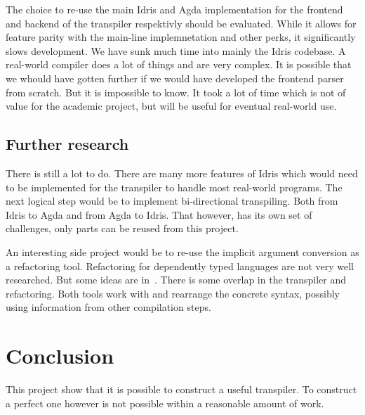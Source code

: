 The choice to re-use the main Idris and Agda implementation for the frontend
and backend of the transpiler respektivly should be evaluated. While it allows
for feature parity with the main-line implemnetation and other perks, it
significantly slows development. We have sunk much time into mainly the Idris
codebase. A real-world compiler does a lot of things and are very
complex. It is possible that we
whould have gotten further if we would have developed the frontend parser from
scratch. But it is impossible to know. It took a lot of time which is not of
value for the academic project, but will be useful for eventual real-world use.


\subsection{Further research}
There is still a lot to do. There are many more features of Idris which would
need to be implemented for the transpiler to handle most real-world programs.
The next logical step would be to implement bi-directional transpiling. Both
from Idris to Agda and from Agda to Idris. That however, has its own set of
challenges, only parts can be reused from this project.

An interesting side project would be to re-use the implicit argument conversion
as a refactoring tool. Refactoring for dependently typed languages are not very
well researched. But some ideas are in~\cite{wibergh2019}. There is some
overlap in the transpiler and refactoring. Both tools work with and rearrange
the concrete syntax, possibly using information from other compilation steps.


\section{Conclusion}

This project show that it is possible to construct
a useful transpiler. To construct a perfect one however is not possible within
a reasonable amount of work.


